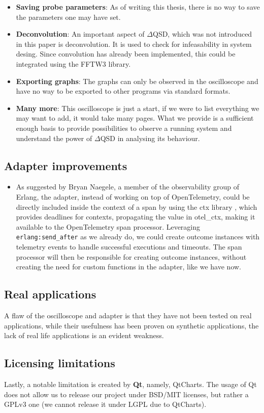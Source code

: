 \begin{itemize}
                \item \textbf{Saving probe parameters}: As of writing this thesis, there is no way to save the parameters one may have set. 
           
                \item \textbf{Deconvolution}: An important aspect of $\Delta$QSD, which was not introduced in this paper is deconvolution. It is used to check for infeasability in system desing. Since convolution has already been implemented, this could be integrated using the FFTW3 library. 

                \item \textbf{Exporting graphs}: The graphs can only be observed in the oscilloscope and have no way to be exported to other programs via standard formats.

                \item \textbf{Many more}: This oscilloscope is just a start, if we were to list everything we may want to add, it would take many pages. What we provide is a sufficient enough basis to provide possibilities to observe a running system and understand the power of $\Delta$QSD in analysing its behaviour.
           \end{itemize} 
                
      \subsection{Adapter improvements}

        \begin{itemize}
            \item As suggested by Bryan Naegele, a member of the observability group of Erlang, the adapter, instead of working on top of OpenTelemetry, could be directly included inside the context of a span by using the ctx library \cite{ctx}, which provides deadlines for contexts, propagating the value in otel\_ctx, making it available to the OpenTelemetry span processor. Leveraging \texttt{erlang:send\_after} as we already do, we could create outcome instances with telemetry events to handle successful executions and timeouts. The span processor will then be responsible for creating outcome instances, without creating the need for custom functions in the adapter, like we have now.
        \end{itemize}
   
    \subsection{Real applications}
        A flaw of the oscilloscope and adapter is that they have not been tested on real applications, while their usefulness has been proven on synthetic applications, the lack of real life applications is an evident weakness.

    \subsection{Licensing limitations}
    Lastly, a notable limitation is created by \textbf{Qt}, namely, QtCharts. The usage of Qt does not allow us to release our project under BSD/MIT licenses, but rather a GPLv3 one (we cannot release it under LGPL due to QtCharts). \cite{qt-gpl}
